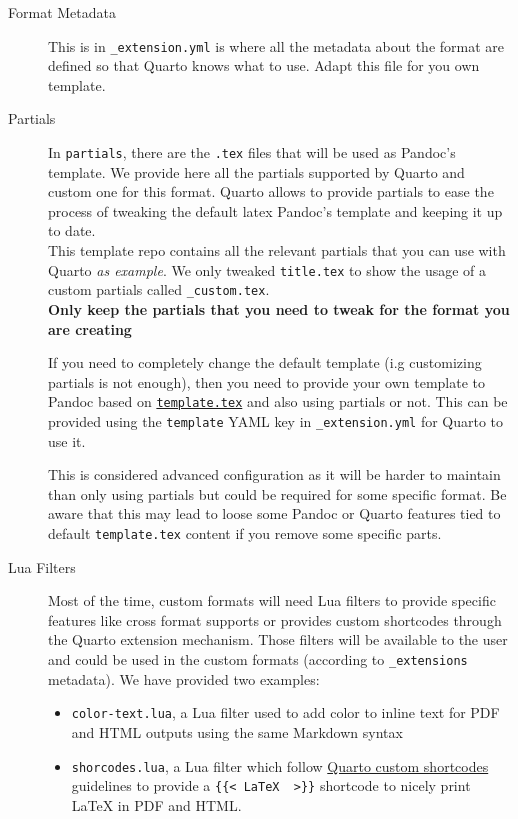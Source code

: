 \documentclass[
  10pt,
]{scrartcl}
\providecommand{\tightlist}{%
  \setlength{\itemsep}{0pt}\setlength{\parskip}{0pt}}\usepackage{longtable,booktabs,array}
\begin{document}
\begin{description}
\item[Format Metadata]
This is in \texttt{\_extension.yml} is where all the metadata about the
format are defined so that Quarto knows what to use. Adapt this file for
you own template.
\item[Partials]
In \texttt{partials}, there are the \texttt{.tex} files that will be
used as Pandoc's template. We provide here all the partials supported by
Quarto and custom one for this format. Quarto allows to provide partials
to ease the process of tweaking the default latex Pandoc's template and
keeping it up to date.\\
This template repo contains all the relevant partials that you can use
with Quarto \emph{as example}. We only tweaked \texttt{title.tex} to
show the usage of a custom partials called \texttt{\_custom.tex}.\\
\textbf{Only keep the partials that you need to tweak for the format you
are creating}

If you need to completely change the default template (i.g customizing
partials is not enough), then you need to provide your own template to
Pandoc based on
\href{https://github.com/quarto-dev/quarto-cli/blob/main/src/resources/formats/pdf/pandoc/template.tex}{\texttt{template.tex}}
and also using partials or not. This can be provided using the
\texttt{template} YAML key in \texttt{\_extension.yml} for Quarto to use
it.

This is considered advanced configuration as it will be harder to
maintain than only using partials but could be required for some
specific format. Be aware that this may lead to loose some Pandoc or
Quarto features tied to default \texttt{template.tex} content if you
remove some specific parts.
\item[Lua Filters]
Most of the time, custom formats will need Lua filters to provide
specific features like cross format supports or provides custom
shortcodes through the Quarto extension mechanism. Those filters will be
available to the user and could be used in the custom formats (according
to \texttt{\_extensions} metadata). We have provided two examples:

\begin{itemize}
\tightlist
\item
  \texttt{color-text.lua}, a Lua filter used to add color to inline text
  for PDF and HTML outputs using the same Markdown syntax
\item
  \texttt{shorcodes.lua}, a Lua filter which follow
  \href{https://quarto.org/docs/authoring/shortcodes.html\#custom-shortcodes}{Quarto
  custom shortcodes} guidelines to provide a
  \texttt{\{\{\textless{}\ LaTeX\ \ \textgreater{}\}\}} shortcode to
  nicely print LaTeX in PDF and HTML.
\end{itemize}


\end{description}
\end{document}

